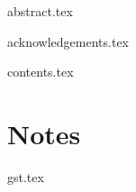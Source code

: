 \documentclass{bris}
\begin{document}

\maketitle

\frontmatter

\makedecl

{abstract.tex}

{acknowledgements.tex}

{contents.tex}
\cleardoublepage

\mainmatter


\chapter{Notes}


{gst.tex}

\backmatter



\end{document}
